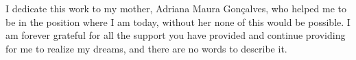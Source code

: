 

I dedicate this work to my mother, Adriana Maura Gonçalves, who helped me to be in the position where I am today, without her none of this would be possible. I am forever grateful for all the support you have provided and continue providing for me to realize my dreams, and there are no words to describe it.

